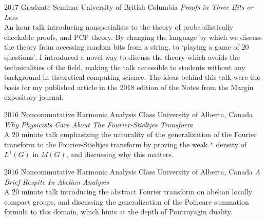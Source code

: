 \documentclass{friggeri-cv}
\begin{document}

\newpage

\begin{entrylist}


\entry
{2017}
{Graduate Seminar}
{University of British Columbia}
{\emph{Proofs in Three Bits or Less}\\
An hour talk introducing nonspecialists to the theory of probabilistically checkable proofs, and PCP theory. By changing the language by which we discuss the theory from accessing random bits from a string, to `playing a game of 20 questions', I introduced a novel way to discuss the theory which avoids the technicalities of the field, making the talk accessible to students without any background in theoretical computing science. The ideas behind this talk were the basis for my published article in the 2018 edition of the Notes from the Margin expository journal.}


\entry
{2016}
{Noncommutative Harmonic Analysis Class}
{University of Alberta, Canada}
{\emph{Why Physicists Care About The Fourier-Stieltjes Transform}\\
A 20 minute talk emphasizing the naturality of the generalization of the Fourier transform to the Fourier-Stieltjes transform by proving the weak $*$ density of $L^1(G)$ in $M(G)$, and discussing why this matters.}

\entry
{2016}
{Noncommutative Harmonic Analysis Class}
{University of Alberta, Canada}
{\emph{A Brief Respite In Abelian Analysis}\\
A 20 minute talk introducing the abstract Fourier transform on abelian locally compact groups, and discussing the generalization of the Poincare summation formula to this domain, which hints at the depth of Pontrayagin duality.}

\end{entrylist}
\end{document}
